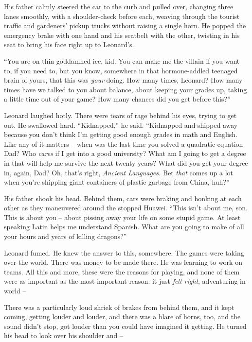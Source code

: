 His father calmly steered the car to the curb and pulled over,
changing three lanes smoothly, with a shoulder-check before each,
weaving through the tourist traffic and gardeners' pickup trucks
without raising a single horn. He popped the emergency brake with
one hand and his seatbelt with the other, twisting in his seat to
bring his face right up to Leonard's.

``You are on thin goddamned ice, kid. You can make me the villain if
you want to, if you need to, but you know, somewhere in that
hormone-addled teenaged brain of yours, that this was \emph{your}
doing. How many times, Leonard? How many times have we talked to
you about balance, about keeping your grades up, taking a little
time out of your game? How many chances did you get before this?''

Leonard laughed hotly. There were tears of rage behind his eyes,
trying to get out. He swallowed hard. ``Kidnapped,'' he said.
``Kidnapped and shipped away because you don't think I'm getting
good enough grades in math and English. Like any of it matters --
when was the last time you solved a quadratic equation Dad? Who
\emph{cares} if I get into a good university? What am I going to
get a degree in that will help me survive the next twenty years?
What did you get your degree in, again, Dad? Oh, that's right,
\emph{Ancient Languages.} Bet \emph{that} comes up a lot when
you're shipping giant containers of plastic garbage from China,
huh?''

His father shook his head. Behind them, cars were braking and
honking at each other as they maneuvered around the stopped Huawei.
``This isn't about me, son. This is about you -- about pissing away
your life on some stupid game. At least speaking Latin helps me
understand Spanish. What are you going to make of all your hours
and years of killing dragons?''

Leonard fumed. He knew the answer to this, somewhere. The games
were taking over the world. There was money to be made there. He
was learning to work on teams. All this and more, these were the
reasons for playing, and none of them were as important as the most
important reason: it just \emph{felt right}, adventuring in-world
--

There was a particularly loud shriek of brakes from behind them,
and it kept coming, getting louder and louder, and there was a
blare of horns, too, and the sound didn't stop, got louder than you
could have imagined it getting. He turned his head to look over his
shoulder and --

